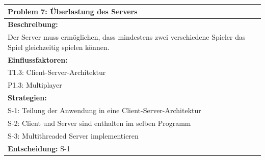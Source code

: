 \documentclass[fontsize=12pt,paper=a4,twoside]{scrartcl}
\begin{document}
\begin{longtable}{|p{15cm}|}
\hline
Problem 7: Überlastung des Servers                                                                           
\\ \hline                                                                                                                                                                                                                                                                                                                                                                                                                                                                                                                                                        
\textbf{Beschreibung:} \\
Der Server muss ermöglichen, dass mindestens zwei verschiedene Spieler das Spiel gleichzeitig spielen können.
\\ \hline
\textbf{Einflussfaktoren:} \\
T1.3: Client-Server-Architektur \\
P1.3: Multiplayer
\\ \hline
\textbf{Strategien:} \\
S-1: Teilung der Anwendung in eine Client-Server-Architektur \\
S-2: Client und Server sind enthalten im selben Programm \\
S-3: Multithreaded Server implementieren
 \\ \hline
 \textbf{Entscheidung:} S-1
\\ \hline
\end{longtable}
\newpage
\end{document}
